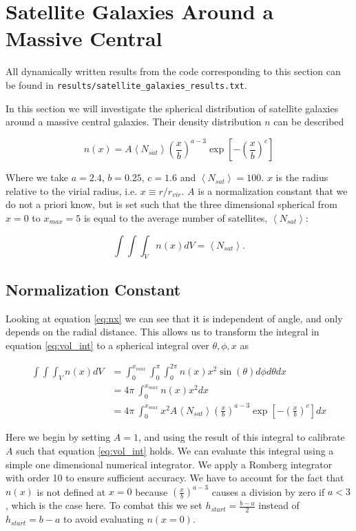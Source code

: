 \section{Satellite Galaxies Around a Massive Central}

All dynamically written results from the code corresponding to this section can be found in \texttt{results/satellite\_galaxies\_results.txt}.

In this section we will investigate the spherical distribution of satellite galaxies around a massive central galaxies. Their density distribution $n$ can be described

\begin{equation}
    n(x) = A\left<N_{sat}\right>\left(\frac{x}{b}\right)^{a-3}\exp{\left[-\left(\frac{x}{b}\right)^{c}\right]}\label{eq:nx}
\end{equation}

Where we take $a = 2.4$, $b = 0.25$, $c = 1.6$ and $\left<N_{sat}\right> = 100$. $x$ is the radius relative to the virial radius, i.e. $x \equiv r/r_{vir}$. $A$ is a normalization constant that we do not a priori know, but is set such that the three dimensional spherical from $x = 0$ to $x_{max} = 5$ is equal to the average number of satellites, $\left<N_{sat}\right>$:

\begin{equation}
    \int\int\int_V n(x)dV = \left<N_{sat}\right>.\label{eq:vol_int}
\end{equation}

\subsection{Normalization Constant}

Looking at equation \ref{eq:nx} we can see that it is independent of angle, and only depends on the radial distance. This allows us to transform the integral in equation \ref{eq:vol_int} to a spherical integral over $\theta, \phi, x$ as

\begin{align*}
    \int\int\int_V n(x)dV &= \int_0^{x_{max}} \int_0^{\pi} \int_0^{2\pi} n(x)x^2\sin(\theta) d\phi d\theta dx \\
& = 4\pi~\int_0^{x_{max}} n(x)x^2 dx \\
&= 4\pi~\int_0^{x_{max}} x^2 A\left<N_{sat}\right>\left(\frac{x}{b}\right)^{a-3}\exp{\left[-\left(\frac{x}{b}\right)^{c}\right]} dx
\end{align*}

Here we begin by setting $A = 1$, and using the result of this integral to calibrate $A$ such that equation \ref{eq:vol_int} holds. We can evaluate this integral using a simple one dimensional numerical integrator. We apply a Romberg integrator with order 10 to ensure sufficient accuracy. We have to account for the fact that $n(x)$ is not defined at $x = 0$ because $\left(\frac{x}{b}\right)^{a-3}$ causes a division by zero if $a < 3$, which is the case here. To combat this we set $h_{start} = \frac{b-a}{2}$ instead of $h_{start} = b-a$ to avoid evaluating $n(x=0)$.

